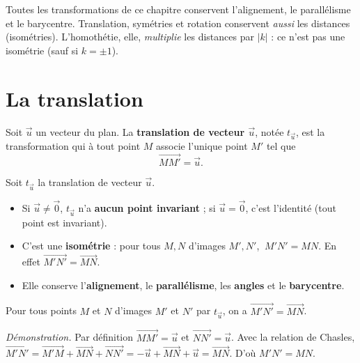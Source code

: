 \begin{remarque}
Toutes les transformations de ce chapitre conservent l'alignement, le parallélisme
et le barycentre. Translation, symétries et rotation conservent \emph{aussi} les
distances (isométries). L'homothétie, elle, \emph{multiplie} les distances par
$|k|$ : ce n'est pas une isométrie (sauf si $k=\pm 1$).
\end{remarque}

\section{La translation}

\begin{definition}
Soit $\vec{u}$ un vecteur du plan. La \textbf{translation de vecteur $\vec{u}$},
notée $t_{\vec{u}}$, est la transformation qui à tout point $M$ associe l'unique
point $M'$ tel que
\[ \overrightarrow{MM'}=\vec{u}. \]
\end{definition}

\begin{propriete}
Soit $t_{\vec u}$ la translation de vecteur $\vec u$.
\begin{itemize}
  \item Si $\vec u\neq\vec 0$, $t_{\vec u}$ n'a \textbf{aucun point invariant} ;
        si $\vec u=\vec 0$, c'est l'identité (tout point est invariant).
  \item C'est une \textbf{isométrie} : pour tous $M,N$ d'images $M',N'$,
        $\ M'N'=MN$. En effet $\overrightarrow{M'N'}=\overrightarrow{MN}$.
  \item Elle conserve l'\textbf{alignement}, le \textbf{parallélisme}, les
        \textbf{angles} et le \textbf{barycentre}.
\end{itemize}
\end{propriete}

\begin{theoreme}
Pour tous points $M$ et $N$ d'images $M'$ et $N'$ par $t_{\vec u}$, on a
$\overrightarrow{M'N'}=\overrightarrow{MN}$.
\end{theoreme}

\begin{remarque}
\textit{Démonstration.} Par définition $\overrightarrow{MM'}=\vec u$ et
$\overrightarrow{NN'}=\vec u$. Avec la relation de Chasles,
$\overrightarrow{M'N'}=\overrightarrow{M'M}+\overrightarrow{MN}+\overrightarrow{NN'}
=-\vec u+\overrightarrow{MN}+\vec u=\overrightarrow{MN}$. D'où $M'N'=MN$.
\end{remarque}


